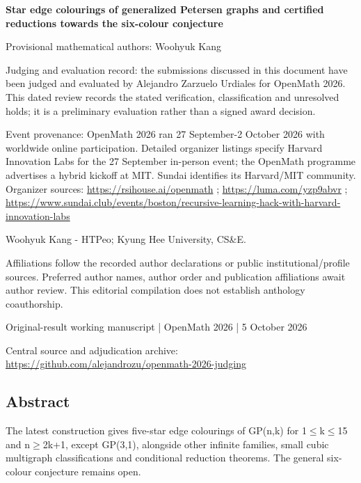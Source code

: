 \documentclass[11pt,a4paper]{article}
\begin{document}
{\LARGE\bfseries Star edge colourings of generalized Petersen graphs and certified reductions towards the six-colour conjecture\par}\medskip
{\small Provisional mathematical authors: Woohyuk Kang\par}\medskip
{\small Judging and evaluation record: the submissions discussed in this document have been judged and evaluated by Alejandro Zarzuelo Urdiales for OpenMath 2026. This dated review records the stated verification, classification and unresolved holds; it is a preliminary evaluation rather than a signed award decision.\par}

{\small Event provenance: OpenMath 2026 ran 27 September-2 October 2026 with worldwide online participation. Detailed organizer listings specify Harvard Innovation Labs for the 27 September in-person event; the OpenMath programme advertises a hybrid kickoff at MIT. Sundai identifies its Harvard/MIT community. Organizer sources: \url{https://rsihouse.ai/openmath} ; \url{https://luma.com/yzp9abvr} ; \url{https://www.sundai.club/events/boston/recursive-learning-hack-with-harvard-innovation-labs}\par}

{\small Woohyuk Kang  -  HTPeo; Kyung Hee University, CS\&E.\par}

{\small Affiliations follow the recorded author declarations or public institutional/profile sources. Preferred author names, author order and publication affiliations await author review. This editorial compilation does not establish anthology coauthorship.\par}

{\small Original-result working manuscript | OpenMath 2026 | 5 October 2026\par}\medskip
{\small Central source and adjudication archive: \url{https://github.com/alejandrozu/openmath-2026-judging}\par}

\subsection{Abstract}
The latest construction gives five-star edge colourings of GP(n,k) for 1\ensuremath{\leq}k\ensuremath{\leq}15 and n\ensuremath{\geq}2k+1, except GP(3,1), alongside other infinite families, small cubic multigraph classifications and conditional reduction theorems. The general six-colour conjecture remains open.
\end{document}
